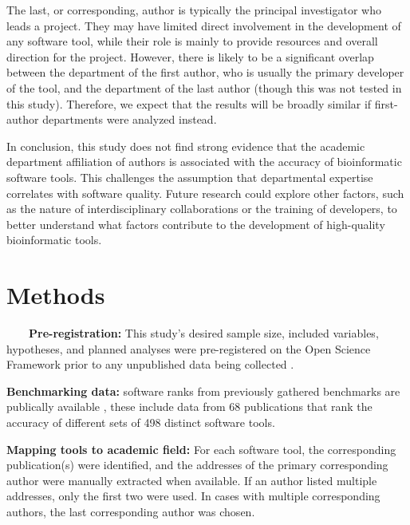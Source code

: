 \documentclass[fleqn,10pt,doc,onecolumn]{SelfArx}%
\begin{document}
The last, or corresponding, author is typically the principal
investigator who leads a project. They may have limited direct
involvement in the development of any software tool, while
their role is mainly to provide resources and overall direction for
the project. However, there is likely to be a significant overlap between the
department of the first author, who is usually the primary developer
of the tool, and the department of the last author (though this was
not tested in this study). Therefore, we expect that the results will
be broadly similar if first-author departments were analyzed instead.

In conclusion, this study does not find strong evidence that the
academic department affiliation of authors is associated with the
accuracy of bioinformatic software tools. This challenges the
assumption that departmental expertise correlates with
software quality. Future research could explore other factors, such
as the nature of interdisciplinary collaborations or the training
of developers, to better understand what factors contribute to
the development of high-quality bioinformatic tools.


\section*{Methods}

~~~~\textbf{Pre-registration:} This study's desired sample size, included variables, hypotheses, and
planned analyses were pre-registered on the Open Science Framework
prior to any unpublished data being collected \cite{gardner2024}.

\textbf{Benchmarking data:} software ranks from previously gathered
benchmarks are publically available \cite{Gardner:2022}, these include data from
68 publications that rank the accuracy of different sets of 498
distinct software tools.

\textbf{Mapping tools to academic field:} For each software tool, the
corresponding publication(s) were identified, and the addresses of the
primary corresponding author were manually extracted when
available. If an author listed multiple addresses, only the first two
were used. In cases with multiple corresponding authors, the last
corresponding author was chosen.
\end{document}

